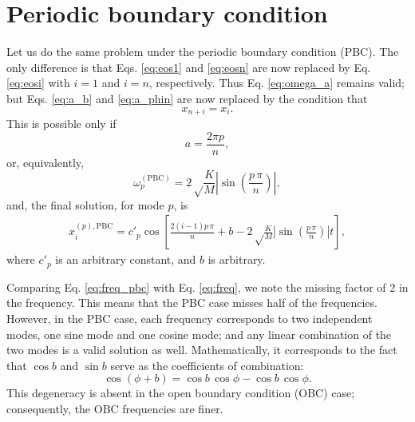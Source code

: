 \documentclass[11pt]{article}
\begin{document}
\section{Periodic boundary condition}



Let us do the same problem under the periodic boundary condition (PBC).
%
The only difference is that Eqs. \eqref{eq:eos1} and \eqref{eq:eosn}
are now replaced by Eq. \eqref{eq:eosi}
with $i = 1$ and $i = n$, respectively.
%
Thus Eq. \eqref{eq:omega_a} remains valid;
but Eqs. \eqref{eq:a_b} and \eqref{eq:a_phin}
are now replaced by the condition that
\[
  x_{n+i} = x_i.
\]
This is possible only if
\begin{equation*}
  a = \frac{ 2 \pi p } { n },
\end{equation*}
or, equivalently,
\begin{equation}
\omega_p^\mathrm{(PBC)}
=
2 \sqrt \frac K M
\left|
\sin \left( \frac {p \, \pi} {n} \right)
\right|,
\label{eq:freq_pbc}
\end{equation}
%
and, the final solution, for mode $p$, is
\begin{align}
  x_i^{(p), \mathrm{PBC}}
=
  c'_p \cos\left[
  \frac{ 2 (i - 1) p \, \pi } { n }
  + b
  -2 \sqrt \frac K M
  \left|
  \sin \left( \frac {p \, \pi} {n} \right)
  \right| t
  \right],
  \label{eq:obcsol}
\end{align}
where $c'_p$ is an arbitrary constant,
and $b$ is arbitrary.
%


Comparing Eq. \eqref{eq:freq_pbc} with Eq. \eqref{eq:freq},
we note the missing factor of 2 in the frequency.
%
This means that the PBC case misses
half of the frequencies.
%
However, in the PBC case,
each frequency corresponds to two independent modes,
one sine mode and one cosine mode;
and any linear combination of the two modes
is a valid solution as well.
%
Mathematically, it corresponds to the fact that
$\cos b$ and $\sin b$ serve as the coefficients of combination:
\[
  \cos(\phi + b) = \cos b \, \cos \phi - \cos b \, \cos \phi.
\]
This degeneracy is absent in the open boundary condition (OBC) case;
consequently, the OBC frequencies are finer.
\end{document}
